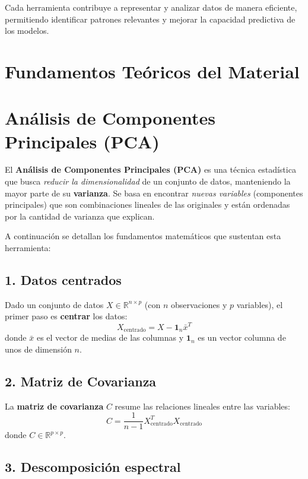 \documentclass[12pt]{article}
\begin{document}
\vspace{1em}
\noindent
Cada herramienta contribuye a representar y analizar datos de manera eficiente, permitiendo identificar patrones relevantes y mejorar la capacidad predictiva de los modelos.


\newpage
\section{Fundamentos Teóricos del Material}

\section*{Análisis de Componentes Principales (PCA)}

\noindent
El \textbf{Análisis de Componentes Principales (PCA)} es una técnica estadística que busca \emph{reducir la dimensionalidad} de un conjunto de datos, manteniendo la mayor parte de su \textbf{varianza}. Se basa en encontrar \emph{nuevas variables} (componentes principales) que son combinaciones lineales de las originales y están ordenadas por la cantidad de varianza que explican.

\vspace{1em}
\noindent
A continuación se detallan los fundamentos matemáticos que sustentan esta herramienta:

\subsection*{1. Datos centrados}

Dado un conjunto de datos \( X \in \mathbb{R}^{n \times p} \) (con \( n \) observaciones y \( p \) variables), el primer paso es \textbf{centrar} los datos:
\[
X_{\text{centrado}} = X - \mathbf{1}_n \bar{x}^T
\]
donde \(\bar{x}\) es el vector de medias de las columnas y \(\mathbf{1}_n\) es un vector columna de unos de dimensión \( n \).

\subsection*{2. Matriz de Covarianza}

La \textbf{matriz de covarianza} \( C \) resume las relaciones lineales entre las variables:
\[
C = \frac{1}{n-1} X_{\text{centrado}}^T X_{\text{centrado}}
\]
donde \( C \in \mathbb{R}^{p \times p} \).

\subsection*{3. Descomposición espectral}
\end{document}
